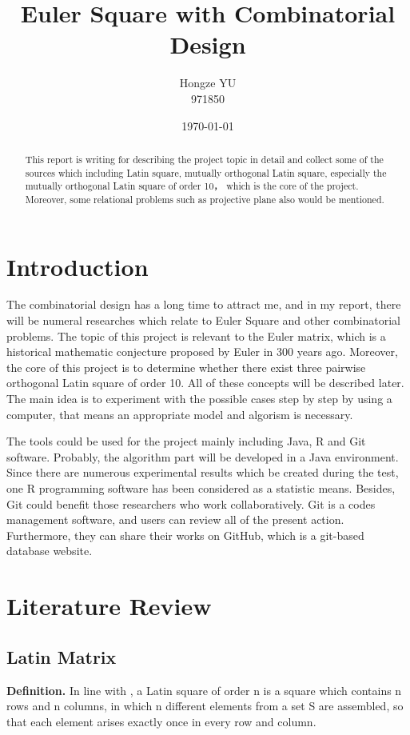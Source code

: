 \documentclass[12pt]{article}
\begin{document}
\title{Euler Square with Combinatorial Design}

\author{Hongze YU\\ {\small 971850}}
\date{\today}
\maketitle
\begin{abstract}
This report is writing for describing the project topic in detail and collect some of the sources which including Latin square, mutually orthogonal Latin square, especially the mutually orthogonal Latin square of order 10， which is the core of the project. Moreover, some relational problems such as projective plane also would be mentioned.
\end{abstract}
\tableofcontents
\section{Introduction}

The combinatorial design has a long time to attract me, and in my report, there will be numeral researches which relate to Euler Square and other combinatorial problems.
The topic of this project is relevant to the Euler matrix, which is a historical mathematic conjecture proposed by Euler in 300 years ago. Moreover, the core of this project is to determine whether there exist three pairwise orthogonal Latin square of order 10. All of these concepts will be described later.  The main idea is to experiment with the possible cases step by step by using a computer, that means an appropriate model and algorism is necessary. 

The tools could be used for the project mainly including Java, R and Git software. Probably, the algorithm part will be developed in a Java environment. Since there are numerous experimental results which be created during the test, one R programming software has been considered as a statistic means. Besides, Git could benefit those researchers who work collaboratively. Git is a codes management software, and users can review all of the present action. Furthermore, they can share their works on GitHub, which is a git-based database website.

\section{Literature Review}

\subsection{Latin Matrix}
\textbf{Definition.} In line with \cite{ref11}, a Latin square of order n is a square which contains n rows and n columns, in which n different elements from a set S are assembled, so that each element arises exactly once in every row and column. 
\end{document}
